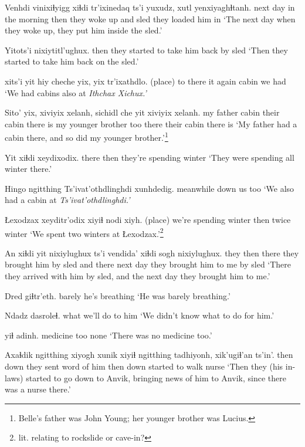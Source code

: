 \documentclass[12pt]{article}
\begin{document}
\gll Venhdi vinixiɬyigg xiɬdi tr'ixinedaq ts'i yuxudz, xutl yenxiyaghɬtanh.
{next day} {in the morning} then {they woke up} and {} sled {they loaded him in}
\glt `The next day when they woke up, they put him inside the sled.'
\glend

\gll Yitots'i nixiytitl'ughux. 
then     {they started to take him back by sled}
\glt `Then they started to take him back on the sled.'
\glend

 xits'i yit hiy cheche yix, yix tr'ixathdlo.
(place)         to     there it again cabin {} {we had}
\glt `We had cabins also at \em Ithchax Xichux.'
\glend

\gll Sito' yix, xiviyix xelanh, sichidl che yit xiviyix xelanh.
{my father} cabin {their cabin} {there is} {my younger brother} too there {their cabin} {there is}
\glt `My father had a cabin there, and so did my younger brother.'\footnote{Belle's father was John Young; her younger brother was Lucius.}
\glend

\gll Yit xiɬdi xeydixodix. 
there then {they're spending winter}
\glt `They were spending all winter there.'
\glend

\gll Hingo ngitthing Ts'ivat'othdlinghdi xunhdedig. 
meanwhile down {} {us too}
\glt `We also had a cabin at \em Ts'ivat'othdlinghdi.'
\glend

\gll Łexodzax  xeyditr'odix    xiyiɬ nodi xiyh.
{(place)}  {we're spending winter} then  twice winter
\glt `We spent two winters at Łexodzax.'\footnote{lit. relating to rockslide or cave-in?}
\glend

\gll An xiɬdi yit nixiylughux ts'i vendida' xiɬdi {sogh nixiylughux.} 
they then there {they brought him by sled} and there {next day} {they brought him to me by sled}
\glt `There they arrived with him by sled, and the next day they brought him to me.'
\glend

\gll Dred giɬtr'eth.
barely {he's breathing}
\glt `He was barely breathing.'
\glend

\gll Ndadz dasroleɬ.        
what {we'll do to him} 
\glt `We didn't know what to do for him.'
\glend

 yiɬ adinh.
medicine   too none
\glt `There was no medicine too.'
\glend

\gll Axaɬdik ngitthing {xiyogh xunik}      xiyiɬ ngitthing tadhiyonh,  xik'ugiɬ'an ts'in'. 
then    down      {they sent word of him} then  down      {started to walk} nurse       
\glt `Then they (his in-laws) started to go down to Anvik, bringing news of him to Anvik, since there was a nurse there.'
\glend
\end{document}
